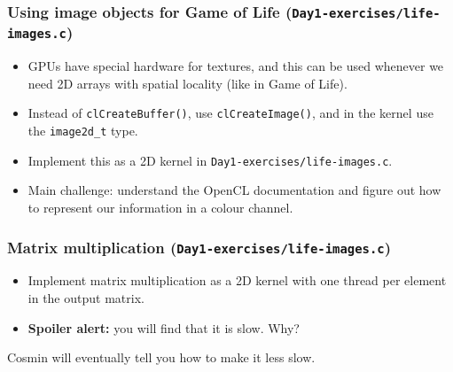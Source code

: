 \documentclass{beamer}
\begin{document}
\begin{frame}
  \frametitle{Using image objects for Game of Life (\texttt{Day1-exercises/life-images.c})}

  \begin{itemize}
  \item GPUs have special hardware for textures, and this can be used
    whenever we need 2D arrays with spatial locality (like in Game of
    Life).

  \item Instead of \texttt{clCreateBuffer()}, use
    \texttt{clCreateImage()}, and in the kernel use the
    \texttt{image2d\_t} type.

  \item Implement this as a 2D kernel in
    \texttt{Day1-exercises/life-images.c}.

  \item Main challenge: understand the OpenCL documentation and figure
    out how to represent our information in a colour channel.
  \end{itemize}
\end{frame}

\begin{frame}
  \frametitle{Matrix multiplication (\texttt{Day1-exercises/life-images.c})}

  \begin{itemize}
  \item Implement matrix multiplication as a 2D kernel with one thread
    per element in the output matrix.
  \item \textbf{Spoiler alert:} you will find that it is slow.  Why?
  \end{itemize}

  Cosmin will eventually tell you how to make it less slow.

\end{frame}
\end{document}
